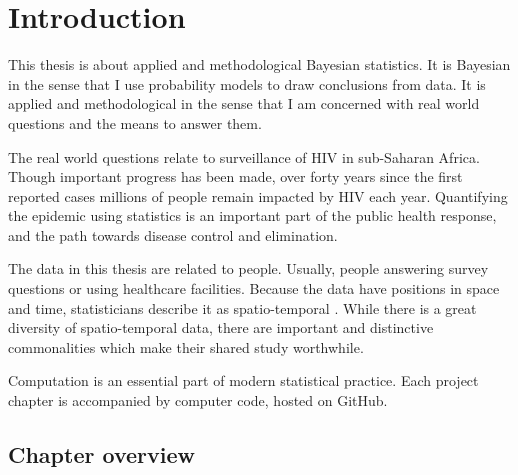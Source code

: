 \documentclass[a4paper, nobind]{templates/ociamthesis}
\begin{document}
\hypertarget{introduction}{%
\chapter{Introduction}\label{introduction}}

\adjustmtc
{}

This thesis is about applied and methodological Bayesian statistics.
It is Bayesian in the sense that I use probability models to draw conclusions from data.
It is applied and methodological in the sense that I am concerned with real world questions and the means to answer them.

The real world questions relate to surveillance of HIV in sub-Saharan Africa.
Though important progress has been made, over forty years since the first reported cases millions of people remain impacted by HIV each year.
Quantifying the epidemic using statistics is an important part of the public health response, and the path towards disease control and elimination.

The data in this thesis are related to people.
Usually, people answering survey questions or using healthcare facilities.
Because the data have positions in space and time, statisticians describe it as spatio-temporal \autocite{cressie2015statistics}.
While there is a great diversity of spatio-temporal data, there are important and distinctive commonalities which make their shared study worthwhile.

Computation is an essential part of modern statistical practice.
Each project chapter is accompanied by computer code, hosted on GitHub.

\hypertarget{chapter-overview}{%
\section{Chapter overview}\label{chapter-overview}}
\end{document}
